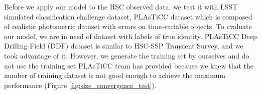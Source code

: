 \documentclass[useamsfonts]{pasj01}
\begin{document}


%
Before we apply our model to the HSC observed data, we test it with LSST simulated classification challenge dataset, PLAsTiCC dataset \citep{allam18a,malz19a} which is composed of realistic photometric dataset with errors on time-variable objects.
To evaluate our model, we are in need of dataset with labels of true identity. 
PLAsTiCC Deep Drilling Field (DDF) dataset is similar to HSC-SSP Transient Survey, and we took advantage of it.
However, %
we generate the training set by ourselves 
and do not use the training set PLAsTiCC team has provided because we knew that the number of training dataset is not good enough to achieve the maximum performance (Figure \ref{fig:size_convergence_test}).
\end{document}
